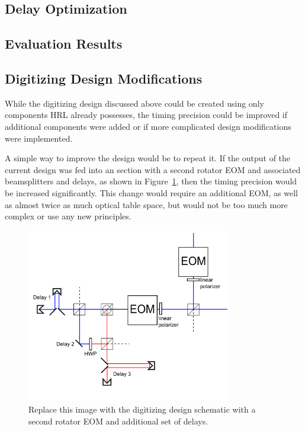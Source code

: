 \documentclass[pdftex,12pt,a4paper]{article}
\begin{document}
\subsection{Delay Optimization}

\subsection{Evaluation Results}

\subsection{Digitizing Design Modifications}
While the digitizing design discussed above could be created using only components HRL already possesses, the timing precision could be improved if additional components were added or if more complicated design modifications were implemented.

A simple way to improve the design would be to repeat it. If the output of the current design was fed into an section with a second rotator EOM and associated beamsplitters and delays, as shown in Figure~\ref{fig:digdesigndouble}, then the timing precision would be increased significantly. This change would require an additional EOM, as well as almost twice as much optical table space, but would not be too much more complex or use any new principles.

\begin{figure}[t]
\centering
\includegraphics[width=0.8\textwidth]{digdesign1.png}
\caption{Replace this image with the digitizing design schematic with a second rotator EOM and additional set of delays.}
\label{fig:digdesigndouble}
\end{figure}
\end{document}
